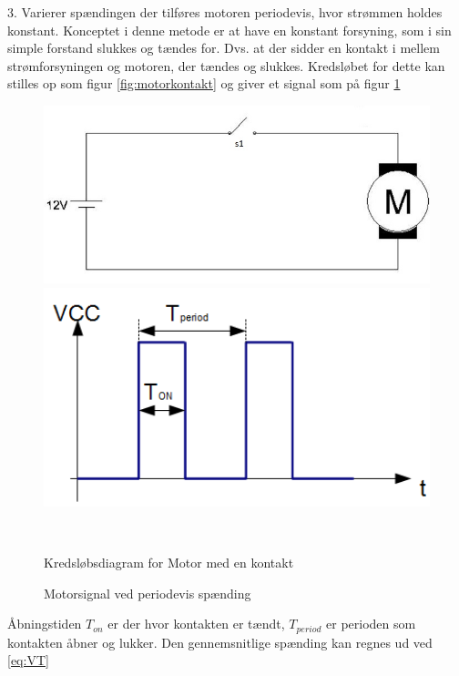 

3. Varierer spændingen der tilføres motoren periodevis, hvor strømmen holdes konstant.
Konceptet i denne metode er at have en konstant forsyning, som i sin simple forstand slukkes og tændes for. Dvs. at der sidder en kontakt i mellem strømforsyningen og motoren, der tændes og slukkes. Kredsløbet for dette kan stilles op som figur \ref{fig:motorkontakt} og giver et signal som på figur \ref{fig:onoffwave}

 \begin{figure}[htbp] \centering
\begin{minipage}[b]{0.48\textwidth} \centering
\includegraphics[width=1.00\textwidth]{billeder/Hardware/motorkontakt.jpg} %
\end{minipage} \hfill
\begin{minipage}[b]{0.48\textwidth} \centering
\includegraphics[width=1.00\textwidth]{billeder/Hardware/onoffwave.jpg} %
\end{minipage} \\ %
\begin{minipage}[t]{0.48\textwidth}
\caption{Kredsløbsdiagram for Motor med en kontakt} %
\label{fig:motorkontakt}
\end{minipage} \hfill
\begin{minipage}[t]{0.48\textwidth}
\caption{Motorsignal ved periodevis spænding } %
\label{fig:onoffwave}
\end{minipage}
\end{figure}
Åbningstiden $T_{on}$ er der hvor kontakten er tændt, $T_{period}$ er perioden som kontakten åbner og lukker. Den gennemsnitlige spænding kan regnes ud ved \ref{eq:VT}

